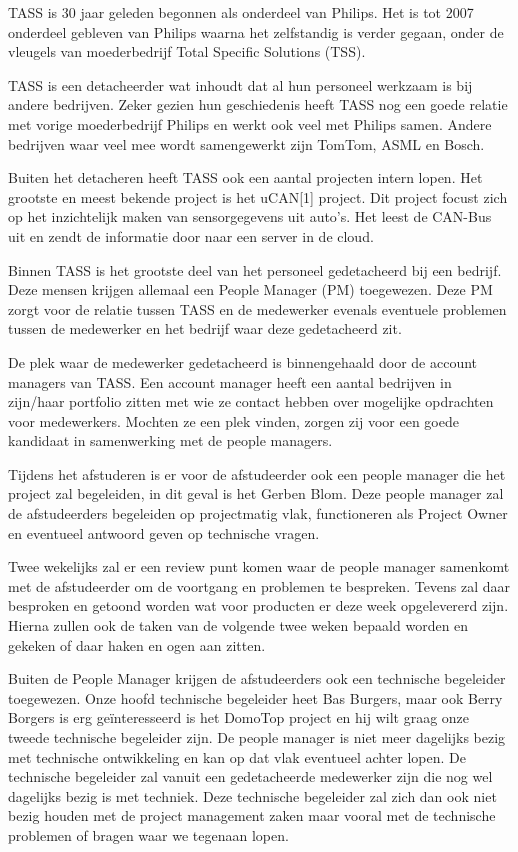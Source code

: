 \documentclass{article}
\begin{document}
TASS is 30 jaar geleden begonnen als onderdeel van Philips. Het is tot 2007
onderdeel gebleven van Philips waarna het zelfstandig is verder gegaan,
onder de vleugels van moederbedrijf Total Specific Solutions (TSS).

TASS is een detacheerder wat inhoudt dat al hun personeel werkzaam is bij
andere bedrijven. Zeker gezien hun geschiedenis heeft TASS nog een goede
relatie met vorige moederbedrijf Philips en werkt ook veel met Philips
samen. Andere bedrijven waar veel mee wordt samengewerkt zijn TomTom, ASML
en Bosch.

Buiten het detacheren heeft TASS ook een aantal projecten intern lopen. Het
grootste en meest bekende project is het uCAN[1] project. Dit project
focust zich op het inzichtelijk maken van sensorgegevens uit auto’s. Het
leest de CAN-Bus uit en zendt de informatie door naar een server in de
cloud.

Binnen TASS is het grootste deel van het personeel gedetacheerd bij een
bedrijf. Deze mensen krijgen allemaal een People Manager (PM) toegewezen.
Deze PM zorgt voor de relatie tussen TASS en de medewerker evenals
eventuele problemen tussen de medewerker en het bedrijf waar deze
gedetacheerd zit.

De plek waar de medewerker gedetacheerd is binnengehaald door de account
managers van TASS. Een account manager heeft een aantal bedrijven in
zijn/haar portfolio zitten met wie ze contact hebben over mogelijke
opdrachten voor medewerkers. Mochten ze een plek vinden, zorgen zij voor
een goede kandidaat in samenwerking met de people managers.

Tijdens het afstuderen is er voor de afstudeerder ook een people manager
die het project zal begeleiden, in dit geval is het Gerben Blom. Deze
people manager zal de afstudeerders begeleiden op projectmatig vlak,
functioneren als Project Owner en eventueel antwoord geven op technische
vragen.

Twee wekelijks zal er een review punt komen waar de people manager
samenkomt met de afstudeerder om de voortgang en problemen te bespreken.
Tevens zal daar besproken en getoond worden wat voor producten er deze week
opgelevererd zijn. Hierna zullen ook de taken van de volgende twee weken
bepaald worden en gekeken of daar haken en ogen aan zitten.

Buiten de People Manager krijgen de afstudeerders ook een technische
begeleider toegewezen. Onze hoofd technische begeleider heet Bas Burgers,
maar ook Berry Borgers is erg geïnteresseerd is het DomoTop project en hij
wilt graag onze tweede technische begeleider zijn. De people manager is
niet meer dagelijks bezig met technische ontwikkeling en kan op dat vlak
eventueel achter lopen. De technische begeleider zal vanuit een
gedetacheerde medewerker zijn die nog wel dagelijks bezig is met techniek.
Deze technische begeleider zal zich dan ook niet bezig houden met de
project management zaken maar vooral met de technische problemen of bragen
waar we tegenaan lopen.
\end{document}

